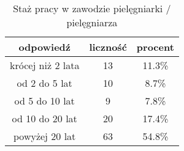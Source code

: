 \begin{table}[H]
\caption{Staż pracy w zawodzie pielęgniarki / pielęgniarza}
\centering
\begin{tabular}{ | c | c | c |}
\hline
odpowiedź & liczność & procent\\
\hline
krócej niż 2 lata  &  13  & 11.3\% \\
\hline
od 2 do 5 lat  &  10  & 8.7\% \\
\hline
od 5 do 10 lat  &  9  & 7.8\% \\
\hline
od 10 do 20 lat  &  20  & 17.4\% \\
\hline
powyżej 20 lat  &  63  & 54.8\% \\
\hline
\end{tabular}
\label{tab:Q1}
\end{table}

